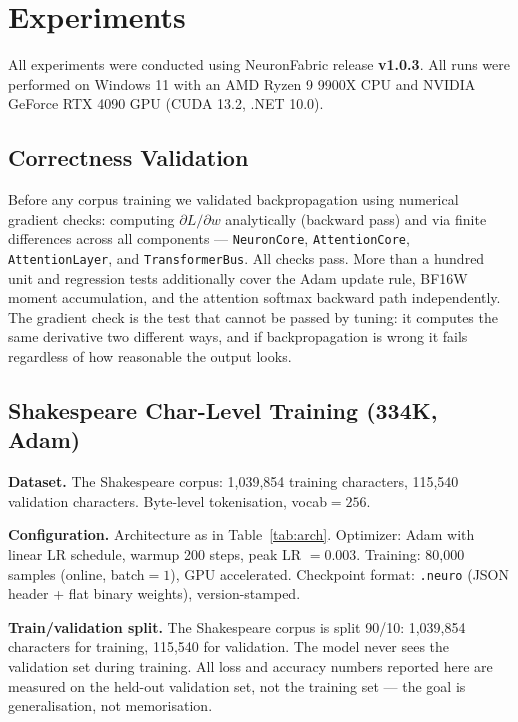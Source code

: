 \documentclass[11pt]{article}
\begin{document}
\section{Experiments}

\label{sec:experiments}

All experiments were conducted using NeuronFabric release \textbf{v1.0.3}.
All runs were performed on Windows 11 with an AMD Ryzen 9 9900X CPU and NVIDIA GeForce RTX 4090 GPU (CUDA 13.2, .NET 10.0).

\subsection{Correctness Validation}

Before any corpus training we validated backpropagation using numerical gradient
checks: computing $\partial L / \partial w$ analytically (backward pass) and via
finite differences across all components --- \texttt{NeuronCore},
\texttt{AttentionCore}, \texttt{AttentionLayer}, and \texttt{TransformerBus}.
All checks pass. More than a hundred unit and regression tests additionally cover the Adam update rule, BF16W moment
accumulation, and the attention softmax backward path independently.
The gradient check is the test that cannot be passed by tuning: it computes the
same derivative two different ways, and if backpropagation is wrong it fails
regardless of how reasonable the output looks.

\subsection{Shakespeare Char-Level Training (334K, Adam)}

\textbf{Dataset.} The Shakespeare corpus: 1,039,854 training characters,
115,540 validation characters. Byte-level tokenisation, vocab$=256$.

\textbf{Configuration.} Architecture as in Table~\ref{tab:arch}.
Optimizer: Adam with linear LR schedule, warmup 200 steps, peak LR $= 0.003$.
Training: 80,000 samples (online, batch$=1$), GPU accelerated.
Checkpoint format: \texttt{.neuro} (JSON header + flat binary weights), version-stamped.

\textbf{Train/validation split.} The Shakespeare corpus is split 90/10:
1,039,854 characters for training, 115,540 for validation.
The model never sees the validation set during training.
All loss and accuracy numbers reported here are measured on the held-out validation set,
not the training set --- the goal is generalisation, not memorisation.
\end{document}
